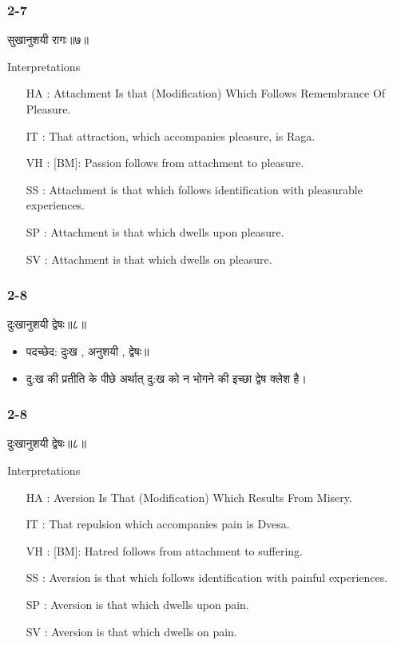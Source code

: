 \begin{frame}[fragile]\frametitle{2-7}
\begin{sanskrit}
सुखानुशयी रागः॥७॥
\end{sanskrit}

Interpretations
\begin{itemize}
\item [HA]: Attachment Is that (Modification) Which Follows Remembrance Of Pleasure.
\item [IT]: That attraction, which accompanies pleasure, is Raga.
\item [VH]: [BM]: Passion follows from attachment to pleasure.
\item [SS]: Attachment is that which follows identification with pleasurable experiences.
\item [SP]: Attachment is that which dwells upon pleasure.
\item [SV]: Attachment is that which dwells on pleasure. 
\end{itemize}
	
\end{frame}

\begin{frame}[fragile]\frametitle{2-8}
\begin{sanskrit}
दुःखानुशयी द्वेषः॥८॥
\end{sanskrit}

\begin{itemize}
\item पदच्छेद: दुःख , अनुशयी , द्वेषः॥
\item दु:ख की प्रतीति के पीछे अर्थात् दु:ख को न भोगने की इच्छा द्वेष क्लेश है।
\end{itemize}

\end{frame}

\begin{frame}[fragile]\frametitle{2-8}
\begin{sanskrit}
दुःखानुशयी द्वेषः॥८॥
\end{sanskrit}

Interpretations
\begin{itemize}
\item [HA]: Aversion Is That (Modification) Which Results From Misery.
\item [IT]: That repulsion which accompanies pain is Dvesa.
\item [VH]: [BM]: Hatred follows from attachment to suffering.
\item [SS]: Aversion is that which follows identification with painful experiences.
\item [SP]: Aversion is that which dwells upon pain.
\item [SV]: Aversion is that which dwells on pain. 
\end{itemize}
\end{frame}




